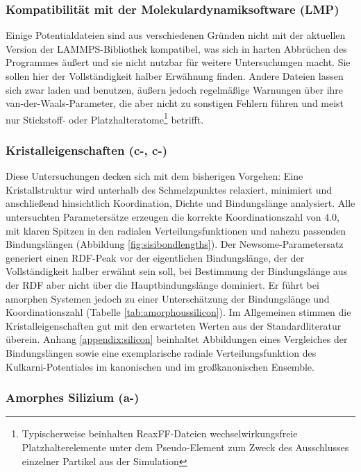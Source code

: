 \subsubsection{Kompatibilität mit der Molekulardynamiksoftware (LMP)}

Einige Potentialdateien sind aus verschiedenen Gründen nicht mit der aktuellen Version der LAMMPS-Bibliothek kompatibel, was sich in harten Abbrüchen des Programmes äußert und sie nicht nutzbar für weitere Untersuchungen macht.
Sie sollen hier der Vollständigkeit halber Erwähnung finden.
Andere Dateien lassen sich zwar laden und benutzen, äußern jedoch regelmäßige Warnungen über ihre van-der-Waals-Parameter, die aber nicht zu sonstigen Fehlern führen und meist nur Stickstoff- oder Platzhalteratome\footnote{Typischerweise beinhalten ReaxFF-Dateien wechselwirkungsfreie Platzhalterelemente unter dem Pseudo-Element  zum Zweck des Ausschlusses einzelner Partikel aus der Simulation} betrifft.

\subsubsection{Kristalleigenschaften (c-, c-)}

Diese Untersuchungen decken sich mit dem bisherigen Vorgehen:
Eine Kristallstruktur wird unterhalb des Schmelzpunktes relaxiert, minimiert und anschließend hinsichtlich Koordination, Dichte und Bindungslänge analysiert.
Alle untersuchten Parametersätze erzeugen die korrekte Koordinationszahl von 4.0, mit klaren Spitzen in den radialen Verteilungsfunktionen und nahezu passenden Bindungslängen (Abbildung \ref{fig:sisibondlengths}).
Der Newsome-Parametersatz generiert einen RDF-Peak vor der eigentlichen Bindungslänge, der der Vollständigkeit halber erwähnt sein soll, bei Bestimmung der Bindungslänge aus der RDF aber nicht über die Hauptbindungslänge dominiert.
Er führt bei amorphen Systemen jedoch zu einer Unterschätzung der Bindungslänge und Koordinationszahl (Tabelle \ref{tab:amorphoussilicon}).
Im Allgemeinen stimmen die Kristalleigenschaften gut mit den erwarteten Werten aus der Standardliteratur überein.
Anhang \ref{appendix:silicon} beinhaltet Abbildungen eines Vergleiches der Bindungslängen sowie eine exemplarische radiale Verteilungsfunktion des Kulkarni-Potentiales im kanonischen und im großkanonischen Ensemble.

\subsubsection{Amorphes Silizium (a-)}

